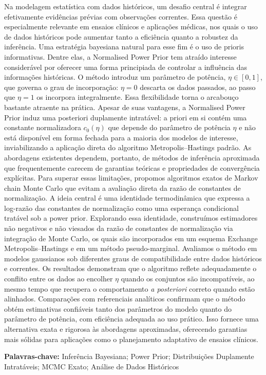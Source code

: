 Na modelagem estatística com dados históricos, um desafio central é integrar efetivamente evidências prévias com observações correntes.
Essa questão é especialmente relevante em ensaios clínicos e aplicações médicas, nos quais o uso de dados históricos pode aumentar tanto a eficiência quanto a robustez da inferência.
Uma estratégia bayesiana natural para esse fim é o uso de prioris informativas.
Dentre elas, a Normalised Power Prior tem atraído interesse considerável por oferecer uma forma principiada de controlar a influência das informações históricas.
O método introduz um parâmetro de potência, $\eta \in [0, 1]$, que governa o grau de incorporação: $\eta = 0$ descarta os dados passados, ao passo que $\eta = 1$ os incorpora integralmente.
Essa flexibilidade torna o arcabouço bastante atraente na prática.
Apesar de suas vantagens, a Normalised Power Prior induz uma posteriori duplamente intratável: a priori em si contém uma constante normalizadora $c_0(\eta)$ que depende do parâmetro de potência $\eta$ e não está disponível em forma fechada para a maioria dos modelos de interesse, inviabilizando a aplicação direta do algoritmo Metropolis--Hastings padrão.
As abordagens existentes dependem, portanto, de métodos de inferência aproximada que frequentemente carecem de garantias teóricas e propriedades de convergência explícitas.
Para superar essas limitações, propomos algoritmos exatos de Markov chain Monte Carlo que evitam a avaliação direta da razão de constantes de normalização.
A ideia central é uma identidade termodinâmica que expressa a log-razão das constantes de normalização como uma esperança condicional tratável sob a power prior.
Explorando essa identidade, construímos estimadores não negativos e não viesados da razão de constantes de normalização via integração de Monte Carlo, os quais são incorporados em um esquema Exchange Metropolis--Hastings e em um método pseudo-marginal.
Avaliamos o método em modelos gaussianos sob diferentes graus de compatibilidade entre dados históricos e correntes.
Os resultados demonstram que o algoritmo reflete adequadamente o conflito entre os dados ao encolher $\eta$ quando os conjuntos são incompatíveis, ao mesmo tempo que recupera o comportamento \textit{a posteriori} correto quando estão alinhados.
Comparações com referenciais analíticos confirmam que o método obtém estimativas confiáveis tanto dos parâmetros do modelo quanto do parâmetro de potência, com eficiência adequada ao uso prático.
Isso fornece uma alternativa exata e rigorosa às abordagens aproximadas, oferecendo garantias mais sólidas para aplicações como o planejamento adaptativo de ensaios clínicos.

\textbf{Palavras-chave:} Inferência Bayesiana; Power Prior; Distribuições Duplamente Intratáveis; MCMC Exato; Análise de Dados Históricos